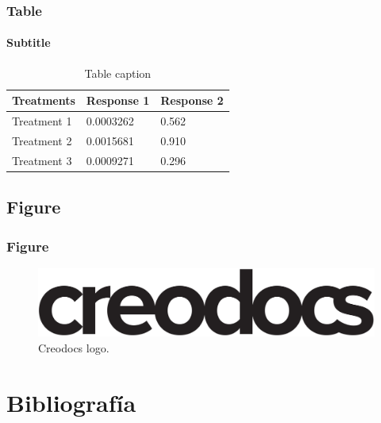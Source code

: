 \documentclass[
	11pt, %
]{beamer}
\begin{document}
\begin{frame}
	\frametitle{Table}
	\framesubtitle{Subtitle} %
	
	\begin{table}
		\begin{tabular}{l l l}
			\toprule
			\textbf{Treatments} & \textbf{Response 1} & \textbf{Response 2}\\
			\midrule
			Treatment 1 & 0.0003262 & 0.562 \\
			Treatment 2 & 0.0015681 & 0.910 \\
			Treatment 3 & 0.0009271 & 0.296 \\
			\bottomrule
		\end{tabular}
		\caption{Table caption}
	\end{table}
\end{frame}


\subsection{Figure}

\begin{frame}
	\frametitle{Figure}
	
	\begin{figure}
		\includegraphics[width=0.8\linewidth]{creodocs_logo.pdf}
		\caption{Creodocs logo.}
	\end{figure}
\end{frame}


\section{Bibliografía}
\end{document}
